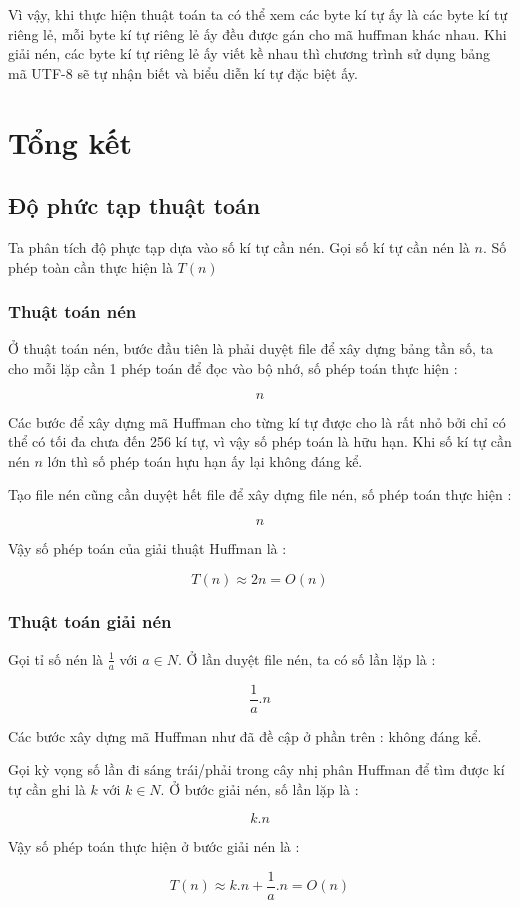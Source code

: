 \documentclass[14pt]{extreport}
\begin{document}
Vì vậy, khi thực hiện thuật toán ta có thể xem các byte kí tự ấy là các byte kí tự riêng lẻ, mỗi byte kí tự riêng lẻ ấy đều được gán cho mã huffman khác nhau. Khi giải nén, các byte kí tự riêng lẻ ấy viết kề nhau thì chương trình sử dụng bảng mã UTF-8 sẽ tự nhận biết và biểu diễn kí tự đặc biệt ấy.
\chapter{Tổng kết}
\section{Độ phức tạp thuật toán}
Ta phân tích độ phực tạp dựa vào số kí tự cần nén. Gọi số kí tự cần nén là $n$. Số phép toàn cần thực hiện là $T(n)$
\subsection{Thuật toán nén}
Ở thuật toán nén, bước đầu tiên là phải duyệt file để xây dựng bảng tần số, ta cho mỗi lặp cần 1 phép toán để đọc vào bộ nhớ, số phép toán thực hiện : 

$$n$$

Các bước để xây dựng mã Huffman cho từng kí tự được cho là rất nhỏ bởi chỉ có thể có tối đa chưa đến 256 kí tự, vì vậy số phép toán là hữu hạn. Khi số kí tự cần nén $n$ lớn thì số phép toán hựu hạn ấy lại không đáng kể.

Tạo file nén cũng cần duyệt hết file để xây dựng file nén, số phép toán thực hiện : 

$$n$$

Vậy số phép toán của giải thuật Huffman là : 

$$T(n)\approx 2n = O(n)$$
\subsection{Thuật toán giải nén}
Gọi tỉ số nén là $\frac{1}{a}$ với $a \in N $. Ở lần duyệt file nén, ta có số lần lặp là : 

$$\frac{1}{a} . n$$

Các bước xây dựng mã Huffman như đã đề cập ở phần trên : không đáng kể.

Gọi kỳ vọng số lần đi sáng trái/phải trong cây nhị phân Huffman để tìm được kí tự cần ghi là $k$ với $k \in N $. Ở bước giải nén, số lần lặp là : 

$$k. n$$

Vậy số phép toán thực hiện ở bước giải nén là : 

$$T(n)\approx k.n + \frac{1}{a} . n = O(n)$$
\end{document}
